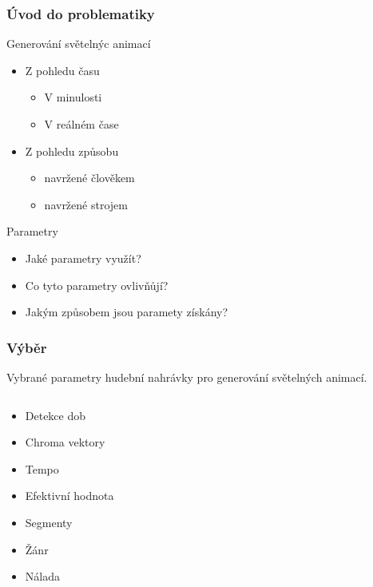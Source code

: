 \documentclass[%
  12pt,       				%
	t,                  %
	aspectratio=1610,   %
	unicode,						%
]{beamer}				    	%
\begin{document}
\begin{frame} 
	\frametitle{Úvod do problematiky}

	\begin{block}{Generování světelnýc animací}
		\begin{itemize}
			\item Z pohledu času
			\begin{itemize}
				\item V minulosti
				\item V reálném čase
			\end{itemize}
			\item Z pohledu způsobu
			\begin{itemize}
				\item navržené člověkem
				\item navržené strojem
			\end{itemize}
		\end{itemize}
	\end{block}

	\begin{block}{Parametry}
		\begin{itemize}
			\item Jaké parametry využít?
			\item Co tyto parametry ovlivňůjí? 
			\item Jakým způsobem jsou paramety získány?
		\end{itemize}
	\end{block}
\end{frame} 

\begin{frame}
	\frametitle{Výběr}
	Vybrané parametry hudební nahrávky pro generování světelných animací.
	\begin{columns}[T]
		\begin{column}{0.3\textwidth}		%
			\begin{itemize}
				\item Detekce dob
				\item Chroma vektory
				\item Tempo
				\item Efektivní hodnota 
				\item Segmenty
				\item Žánr
				\item Nálada
			\end{itemize}
		\end{column}
		\begin{column}{0.7\textwidth}		
		\end{column}
		
	\end{columns}
\end{frame}
\end{document}
